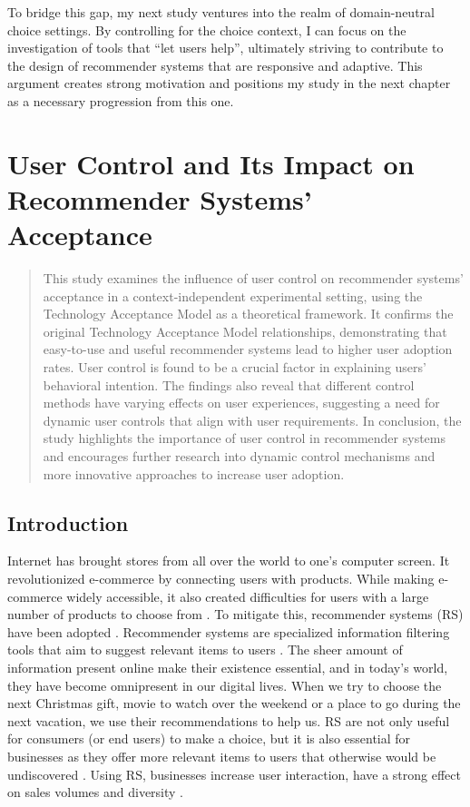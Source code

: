 \documentclass[a4paper,12pt]{article}
\begin{document}
To bridge this gap, my next study ventures into the realm of domain-neutral choice settings. By controlling for the choice context, I can focus on the investigation of tools that ``let users help'', ultimately striving to contribute to the design of recommender systems that are responsive and adaptive. This argument creates strong motivation and positions my study in the next chapter as a necessary progression from this one.


\newpage


\section{User Control and Its Impact on Recommender Systems' Acceptance}\label{chapter:UserControlAndRS}
\begin{abstract}

    This study examines the influence of user control on recommender systems' acceptance in a context-independent experimental setting, using the Technology Acceptance Model as a theoretical framework. It confirms the original Technology Acceptance Model relationships, demonstrating that easy-to-use and useful recommender systems lead to higher user adoption rates. User control is found to be a crucial factor in explaining users' behavioral intention. The findings also reveal that different control methods have varying effects on user experiences, suggesting a need for dynamic user controls that align with user requirements. In conclusion, the study highlights the importance of user control in recommender systems and encourages further research into dynamic control mechanisms and more innovative approaches to increase user adoption.
    
\end{abstract}

\subsection{Introduction}

Internet has brought stores from all over the world to one's computer screen. It revolutionized e-commerce by connecting users with products. While making e-commerce widely accessible, it also created difficulties for users with a large number of products to choose from \citep{ricci2011introduction}. To mitigate this, recommender systems (RS) have been adopted \citep{kotkovSurveySerendipityRecommender2016}. Recommender systems are specialized information filtering tools that aim to suggest relevant items to users \citep{adomavicius2005toward}. The sheer amount of information present online make their existence essential, and in today's world, they have become omnipresent in our digital lives. When we try to choose the next Christmas gift, movie to watch over the weekend or a place to go during the next vacation, we use their recommendations to help us. RS are not only useful for consumers (or end users) to make a choice, but it is also essential for businesses as they offer more relevant items to users that otherwise would be undiscovered \citep{ricci2011introduction}. Using RS, businesses increase user interaction, have a strong effect on sales volumes and diversity \citep{songWhenHowDiversify2019}.
\end{document}
